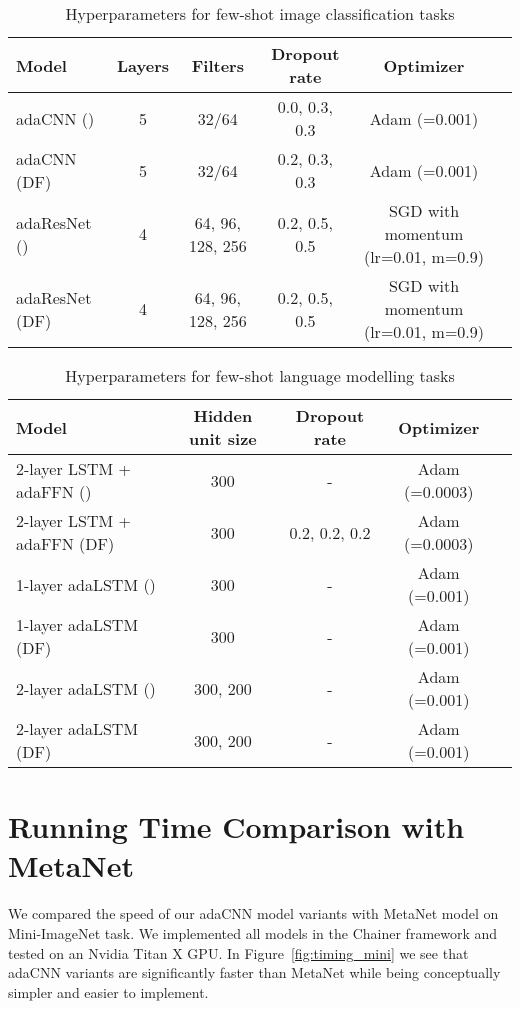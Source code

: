\documentclass{article}
\begin{document}
\begin{table}[h]
  \centering
  \caption{Hyperparameters for few-shot image classification tasks}
  \label{tab:hyper-img}
  \small
\begin{tabular}{lccccc}
    \toprule
        \bf Model & \bf Layers & \bf Filters & \bf Dropout rate & \bf Optimizer \\
    \midrule
        adaCNN () & 5 & 32/64 & 0.0, 0.3, 0.3 &	Adam (=0.001) \\
        adaCNN (DF) & 5 &	32/64 &	0.2, 0.3, 0.3 &	Adam (=0.001) \\
        adaResNet () & 4 &	64, 96, 128, 256 &	0.2, 0.5, 0.5 & SGD with momentum (lr=0.01, m=0.9) \\
        adaResNet (DF) & 4 & 64, 96, 128, 256 &	0.2, 0.5, 0.5 & SGD with momentum (lr=0.01, m=0.9) \\
    \bottomrule
  \end{tabular}
\end{table}


\begin{table}[h]
\vskip -0.5cm
  \caption{Hyperparameters for few-shot language modelling tasks}
  \label{tab:hyper-lm}
  \small
  \centering
  \begin{tabular}{lcccc}
    \toprule
        \bf Model & \bf Hidden unit size & \bf Dropout rate & \bf Optimizer \\
    \midrule
2-layer LSTM + adaFFN () &	300 &	- &	Adam (=0.0003) \\
        2-layer LSTM + adaFFN (DF) &	300 &	0.2, 0.2, 0.2 & Adam (=0.0003) \\
        1-layer adaLSTM () &	300 &	- &	Adam (=0.001) \\
        1-layer adaLSTM (DF) &	300 &	- &	Adam (=0.001) \\
        2-layer adaLSTM () &	300, 200 &	- &	Adam (=0.001) \\
        2-layer adaLSTM (DF) &	300, 200 &	- &	Adam (=0.001) \\
    \bottomrule
  \end{tabular}
\end{table}

\clearpage



\section{Running Time Comparison with MetaNet}
\label{sec:speed}
We compared the speed of our adaCNN model variants with MetaNet model on Mini-ImageNet task. We implemented all models in the Chainer framework \cite{chainer_learningsys2015} and tested on an Nvidia Titan X GPU. In Figure~\ref{fig:timing_mini} we see that adaCNN variants are significantly faster than MetaNet while being  conceptually simpler and easier to implement.
\end{document}
